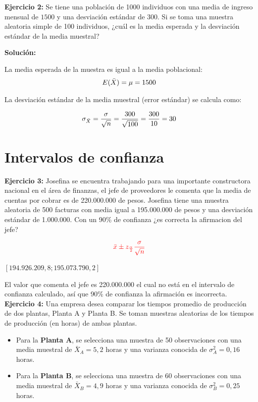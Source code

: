 \documentclass[10pt,a4paper]{article}
\begin{document}
\textbf{Ejercicio 2:} Se tiene una población de 1000 individuos con una media de ingreso mensual de $1500$ y una desviación estándar de $300$. Si se toma una muestra aleatoria simple de 100 individuos, ¿cuál es la media esperada y la desviación estándar de la media muestral?

{\color{red} \textbf{Solución:}

La media esperada de la muestra es igual a la media poblacional:
$$E(\Bar{X}) = \mu = 1500$$


La desviación estándar de la media muestral (error estándar) se calcula como:

$$\sigma_{\Bar{X}} = \frac{\sigma}{\sqrt{n}} = \frac{300}{\sqrt{100}} = \frac{300}{10} = 30$$}



\section{Intervalos de confianza}



\textbf{Ejercicio 3:} Josefina se encuentra trabajando para una importante constructora nacional en el \'area de finanzas, el jefe de
proveedores le comenta que la media de cuentas por cobrar es de 220.000.000 de pesos. Josefina tiene una  muestra aleatoria de 500 facturas con media igual a 195.000.000 de pesos y una desviaci\'on
est\'andar de 1.000.000. Con un 90\% de confianza ¿es correcta la afirmacion del jefe?


    $$\color{red}{\bar{x} \pm z_{\frac{\alpha}{2}}\frac{\sigma}{\sqrt{n}}}$$

{\color{red}$[194.926.209,8 ; 195.073.790,2]$ }


   {\color{red}  El valor que comenta el jefe es 220.000.000 el cual no está en el intervalo de confianza calculado, así que  90\% de confianza la afirmación es incorrecta. }
\\
   
\textbf{Ejercicio 4:} Una empresa desea comparar los tiempos promedio de producción de dos plantas, Planta A y Planta B. Se toman muestras aleatorias de los tiempos de producción (en horas) de ambas plantas.

\begin{itemize}
    \item Para la \textbf{Planta A}, se selecciona una muestra de 50 observaciones con una media muestral de \( \bar{X}_A = 5,2 \) horas y una varianza conocida de \( \sigma_A^2 = 0,16 \) horas.
    \item Para la \textbf{Planta B}, se selecciona una muestra de 60 observaciones con una media muestral de \( \bar{X}_B = 4,9 \) horas y una varianza conocida de \( \sigma_B^2 = 0,25 \) horas.
\end{itemize}
\end{document}
